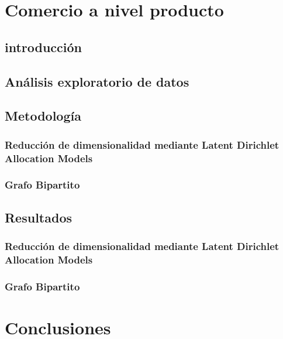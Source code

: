 \documentclass[11pt,a4paper]{tesis}
\begin{document}

\chapter{Comercio a nivel producto}



\section{introducción}


\section{Análisis exploratorio de datos}

\section{Metodología}

\subsection{Reducción de dimensionalidad mediante Latent Dirichlet Allocation Models}

\subsection{Grafo Bipartito}

\section{Resultados}

\subsection{Reducción de dimensionalidad mediante Latent Dirichlet Allocation Models}

\subsection{Grafo Bipartito}


\chapter{Conclusiones}




\backmatter
%


%
\end{document}
